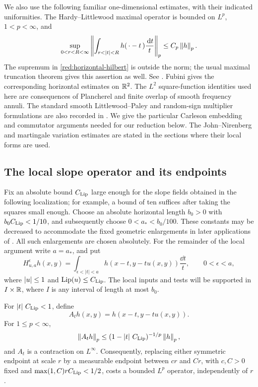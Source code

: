 We also use the following familiar one-dimensional estimates, with
their indicated uniformities. The Hardy--Littlewood maximal operator
is bounded on \(L^p\), \(1<p<\infty\), and
\begin{equation}\label{red:horizontal-hilbert}
 \sup_{0<r<R<\infty}
 \left\|\int_{r<|t|<R}h(\,\cdot-t\,)\frac{\dd t}{t}\right\|_p
   \le C_p\norm h_p.
\end{equation}
The supremum in \eqref{red:horizontal-hilbert} is outside the norm;
the usual maximal truncation theorem gives this assertion as well.
See \cite[Theorems~1.1 and~7.6 and the proof of (7.7)]{Hajlasz2012}.
Fubini gives the corresponding horizontal estimates on \(\mathbb R^2\).
The \(L^2\) square-function identities used here are consequences of
Plancherel and finite overlap of smooth frequency annuli. The standard
smooth Littlewood--Paley and random-sign multiplier formulations are
also recorded in \cite[Proposition~5.3, Corollary~5.4, and
Remark~4.5]{Tao2006Notes4}. We give the particular Carleson embedding
and commutator arguments needed for our reduction below. The
John--Nirenberg and martingale variation estimates are stated in the
sections where their local forms are used.

\subsection{The local slope operator and its endpoints}

Fix an absolute bound \(C_{\rm Lip}\) large enough for the slope
fields obtained in the following localization; for example, a bound
of ten suffices after taking the squares small enough. Choose an
absolute horizontal length \(b_0>0\) with
\(b_0 C_{\rm Lip}<1/10\), and subsequently choose
\(0<a_*<b_0/100\). These constants may be decreased to accommodate
the fixed geometric enlargements in later applications of
. All such enlargements are chosen absolutely.
For the remainder of the local argument write \(a=a_*\), and put
\begin{equation}\label{red:local-operator}
 H_{u,a}^{\epsilon}h(x,y)
   =\int_{\epsilon<|t|<a}
      h(x-t,y-tu(x,y))\frac{\dd t}{t},
 \qquad 0<\epsilon<a,
\end{equation}
where \(\left|u\right|\le1\) and \(\operatorname{Lip}(u)\le C_{\rm Lip}\).
The local inputs and tests will be supported in
\(I\times\mathbb R\), where \(I\) is any interval of length at most
\(b_0\).

\begin{lemma}\label{red:fixed-time}
For \(\left|t\right|\,C_{\rm Lip}<1\), define
\[
 A_t h(x,y)=h(x-t,y-tu(x,y)).
\]
For \(1\le p<\infty\),
\begin{equation}\label{red:translate-bound}
 \left\|A_t h\right\|_p
   \le (1-\left|t\right|\,C_{\rm Lip})^{-1/p}\left\|h\right\|_p,
\end{equation}
and \(A_t\) is a contraction on \(L^\infty\).
Consequently, replacing either symmetric endpoint at scale \(r\)
by a measurable endpoint between \(c r\) and \(C r\), with
\(c,C>0\) fixed and \(\max(1,C)r C_{\rm Lip}<1/2\), costs a bounded
\(L^p\) operator, independently of \(r\).
\end{lemma}

